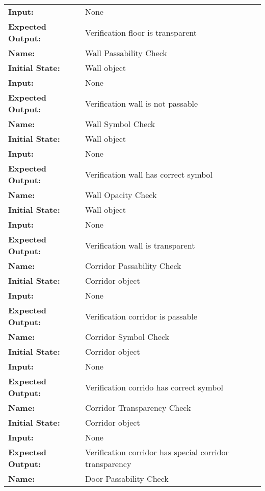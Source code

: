 \documentclass[12pt, titlepage]{article}
\begin{document}
\begin{center}
\begin{longtable}{ l | p{10cm} }
				\textbf{Input:} & None\\
				\textbf{Expected Output:} & Verification floor is transparent\\[0.6em]
				\hline
				\rule{0pt}{1.5em}\textbf{Name:} & Wall Passability Check\\
				\textbf{Initial State:} & Wall object\\
				\textbf{Input:} & None\\
				\textbf{Expected Output:} & Verification wall is not passable\\[0.6em]
				\hline
				\rule{0pt}{1.5em}\textbf{Name:} & Wall Symbol Check\\
				\textbf{Initial State:} & Wall object\\
				\textbf{Input:} & None\\
				\textbf{Expected Output:} & Verification wall has correct symbol\\[0.6em]
				\hline
				\rule{0pt}{1.5em}\textbf{Name:} & Wall Opacity Check\\
				\textbf{Initial State:} & Wall object\\
				\textbf{Input:} & None\\
				\textbf{Expected Output:} & Verification wall is transparent\\[0.6em]
				\rule{0pt}{1.5em}\textbf{Name:} & Corridor Passability Check\\
				\textbf{Initial State:} & Corridor object\\
				\textbf{Input:} & None\\
				\textbf{Expected Output:} & Verification corridor is passable\\[0.6em]
				\hline
				\rule{0pt}{1.5em}\textbf{Name:} & Corridor Symbol Check\\
				\textbf{Initial State:} & Corridor object\\
				\textbf{Input:} & None\\
				\textbf{Expected Output:} & Verification corrido has correct symbol\\[0.6em]
				\hline
				\rule{0pt}{1.5em}\textbf{Name:} & Corridor Transparency Check\\
				\textbf{Initial State:} & Corridor object\\
				\textbf{Input:} & None\\
				\textbf{Expected Output:} & Verification corridor has special corridor transparency\\[0.6em]
				\hline
				\rule{0pt}{1.5em}\textbf{Name:} & Door Passability Check\\

\end{longtable}
\end{center}
\end{document}

